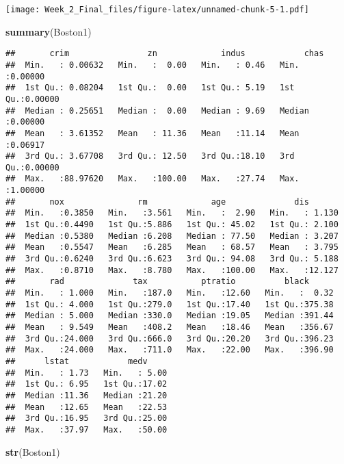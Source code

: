 \documentclass[]{article}
\newenvironment{Shaded}{\begin{snugshade}}{\end{snugshade}}
\newcommand{\KeywordTok}[1]{\textcolor[rgb]{0.13,0.29,0.53}{\textbf{#1}}}
\newcommand{\NormalTok}[1]{#1}
\begin{document}
\texttt{[image: Week\_2\_Final\_files/figure-latex/unnamed-chunk-5-1.pdf]}

\begin{Shaded}
\begin{Highlighting}[]
\KeywordTok{summary}\NormalTok{(Boston1)}
\end{Highlighting}
\end{Shaded}

\begin{verbatim}
##       crim                zn             indus            chas        
##  Min.   : 0.00632   Min.   :  0.00   Min.   : 0.46   Min.   :0.00000  
##  1st Qu.: 0.08204   1st Qu.:  0.00   1st Qu.: 5.19   1st Qu.:0.00000  
##  Median : 0.25651   Median :  0.00   Median : 9.69   Median :0.00000  
##  Mean   : 3.61352   Mean   : 11.36   Mean   :11.14   Mean   :0.06917  
##  3rd Qu.: 3.67708   3rd Qu.: 12.50   3rd Qu.:18.10   3rd Qu.:0.00000  
##  Max.   :88.97620   Max.   :100.00   Max.   :27.74   Max.   :1.00000  
##       nox               rm             age              dis        
##  Min.   :0.3850   Min.   :3.561   Min.   :  2.90   Min.   : 1.130  
##  1st Qu.:0.4490   1st Qu.:5.886   1st Qu.: 45.02   1st Qu.: 2.100  
##  Median :0.5380   Median :6.208   Median : 77.50   Median : 3.207  
##  Mean   :0.5547   Mean   :6.285   Mean   : 68.57   Mean   : 3.795  
##  3rd Qu.:0.6240   3rd Qu.:6.623   3rd Qu.: 94.08   3rd Qu.: 5.188  
##  Max.   :0.8710   Max.   :8.780   Max.   :100.00   Max.   :12.127  
##       rad              tax           ptratio          black       
##  Min.   : 1.000   Min.   :187.0   Min.   :12.60   Min.   :  0.32  
##  1st Qu.: 4.000   1st Qu.:279.0   1st Qu.:17.40   1st Qu.:375.38  
##  Median : 5.000   Median :330.0   Median :19.05   Median :391.44  
##  Mean   : 9.549   Mean   :408.2   Mean   :18.46   Mean   :356.67  
##  3rd Qu.:24.000   3rd Qu.:666.0   3rd Qu.:20.20   3rd Qu.:396.23  
##  Max.   :24.000   Max.   :711.0   Max.   :22.00   Max.   :396.90  
##      lstat            medv      
##  Min.   : 1.73   Min.   : 5.00  
##  1st Qu.: 6.95   1st Qu.:17.02  
##  Median :11.36   Median :21.20  
##  Mean   :12.65   Mean   :22.53  
##  3rd Qu.:16.95   3rd Qu.:25.00  
##  Max.   :37.97   Max.   :50.00
\end{verbatim}

\begin{Shaded}
\begin{Highlighting}[]
\KeywordTok{str}\NormalTok{(Boston1)}
\end{Highlighting}
\end{Shaded}
\end{document}
